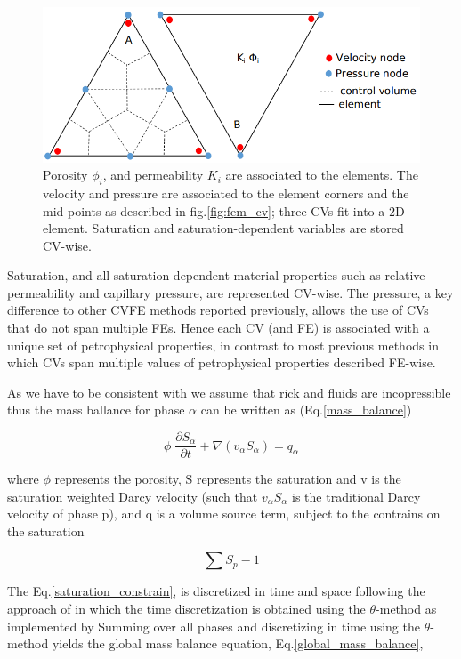 \documentclass[preprint,authoryear,12pt]{elsarticle}
\begin{document}
\begin{figure}[h] 
\centering
\includegraphics[width=.5\textwidth]{./Pics/element_n.png}
\caption{Porosity $\phi_{i}$, and permeability $K_{i}$ are associated to the elements. The velocity and pressure are associated to the element corners and the mid-points as described in fig.\ref{fig:fem_cv}; three CVs fit into a $2$D element. Saturation and saturation-dependent variables are stored CV-wise.}
\label{fig:fem_elem}
\end{figure}

Saturation, and all saturation-dependent material properties such as relative permeability and capillary pressure, are represented CV-wise. The pressure, a key difference to other CVFE methods reported previously, allows the use of CVs that do not span multiple FEs. Hence each CV (and FE) is associated with a unique set of petrophysical properties, in contrast to most previous methods in which CVs span multiple values of petrophysical properties described FE-wise.

As we have to be consistent with \citet{jackson_2015} we assume that rick and fluids are incopressible thus the mass ballance for phase $\alpha$ can be written as (Eq.\ref{mass_balance})

\begin{equation}
\phi \; \frac{\partial S_{\alpha}}{\partial t} + \nabla (v_{\alpha}S_{\alpha})= q_{\alpha}
\label{mass_balance}
\end{equation}
 
where $\phi$ represents the porosity, S represents the saturation and v is the saturation weighted Darcy velocity (such that $v_{\alpha}S_{\alpha}$ is the traditional Darcy velocity of phase p), and q is a volume source term, subject to the contrains on the saturation

\begin{equation}
\sum  S_{p}-1
\label{saturation_constrain}
\end{equation}

The Eq.\ref{saturation_constrain}, is discretized in time and space following the approach of \citet{Jackson_2013} in which the time discretization is obtained using the $\theta$-method as implemented by %
Summing over all phases and discretizing in time using the $\theta$-method yields the global mass balance equation, Eq.\ref{global_mass_balance},
\end{document}
